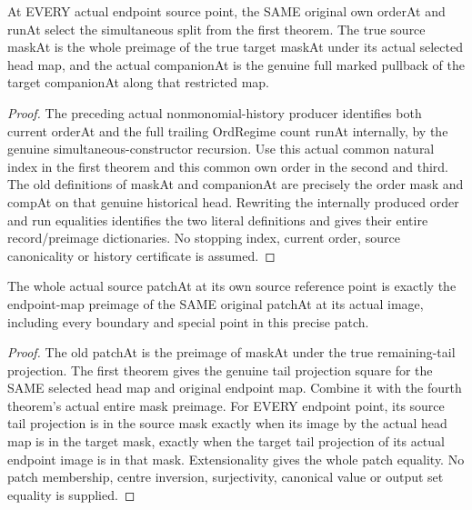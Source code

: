 \begin{theorem}
\label{hir:submersion-historical-masks-own-index}
\leanok
At EVERY actual endpoint source point, the SAME original own orderAt and
runAt select the simultaneous split from the first theorem. The true
source maskAt is the whole preimage of the true target maskAt under its
actual selected head map, and the actual companionAt is the genuine full
marked pullback of the target companionAt along that restricted map.
\end{theorem}
\begin{proof}
The preceding actual nonmonomial-history producer identifies both current
orderAt and the full trailing OrdRegime count runAt internally, by the
genuine simultaneous-constructor recursion. Use this actual common natural
index in the first theorem and this common own order in the second and
third. The old definitions of maskAt and companionAt are precisely the
order mask and compAt on that genuine historical head. Rewriting the
internally produced order and run equalities identifies the two literal
definitions and gives their entire record/preimage dictionaries. No
stopping index, current order, source canonicality or history certificate
is assumed.
\end{proof}

\begin{theorem}
\label{hir:submersion-historical-masks-patch}
\leanok
The whole actual source patchAt at its own source reference point is exactly
the endpoint-map preimage of the SAME original patchAt at its actual image,
including every boundary and special point in this precise patch.
\end{theorem}
\begin{proof}
The old patchAt is the preimage of maskAt under the true remaining-tail
projection. The first theorem gives the genuine tail projection square
for the SAME selected head map and original endpoint map. Combine it with
the fourth theorem's actual entire mask preimage. For EVERY endpoint point,
its source tail projection is in the source mask exactly when its image by
the actual head map is in the target mask, exactly when the target tail
projection of its actual endpoint image is in that mask. Extensionality
gives the whole patch equality. No patch membership, centre inversion,
surjectivity, canonical value or output set equality is supplied.
\end{proof}


